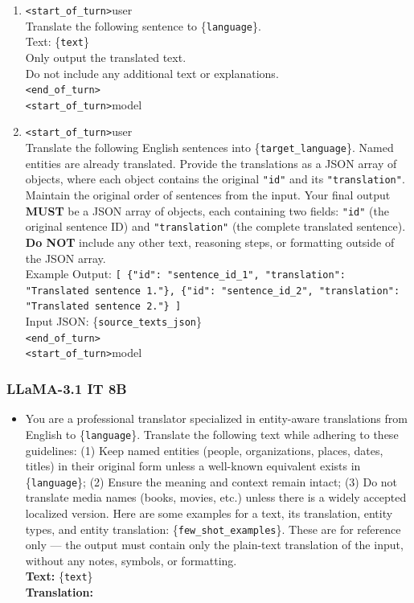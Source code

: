 \documentclass{ecai}
\begin{document}
\begin{enumerate}
    \item \texttt{<start\_of\_turn>}user\\
    Translate the following sentence to \{\texttt{language}\}.\\
    Text: \{\texttt{text}\}\\
    Only output the translated text.\\
    Do not include any additional text or explanations.\\
    \texttt{<end\_of\_turn>}\\
    \texttt{<start\_of\_turn>}model

    \item \texttt{<start\_of\_turn>}user\\
    Translate the following English sentences into \{\texttt{target\_language}\}. Named entities are already translated. Provide the translations as a JSON array of objects, where each object contains the original \texttt{"id"} and its \texttt{"translation"}. Maintain the original order of sentences from the input. Your final output \textbf{MUST} be a JSON array of objects, each containing two fields: \texttt{"id"} (the original sentence ID) and \texttt{"translation"} (the complete translated sentence). \textbf{Do NOT} include any other text, reasoning steps, or formatting outside of the JSON array.\\
    Example Output: \texttt{[ \{"id": "sentence\_id\_1", "translation": "Translated sentence 1."\}, \{"id": "sentence\_id\_2", "translation": "Translated sentence 2."\} ]}\\
    Input JSON: \{\texttt{source\_texts\_json}\}\\
    \texttt{<end\_of\_turn>}\\
    \texttt{<start\_of\_turn>}model
\end{enumerate}

\subsubsection{LLaMA-3.1 IT 8B}

\begin{itemize}
    \item You are a professional translator specialized in entity-aware translations from English to \{\texttt{language}\}. Translate the following text while adhering to these guidelines: (1) Keep named entities (people, organizations, places, dates, titles) in their original form unless a well-known equivalent exists in \{\texttt{language}\}; (2) Ensure the meaning and context remain intact; (3) Do not translate media names (books, movies, etc.) unless there is a widely accepted localized version. Here are some examples for a text, its translation, entity types, and entity translation: \{\texttt{few\_shot\_examples}\}. These are for reference only — the output must contain only the plain-text translation of the input, without any notes, symbols, or formatting.\\
    \textbf{Text:} \{\texttt{text}\}\\
    \textbf{Translation:}
\end{itemize}
\end{document}
